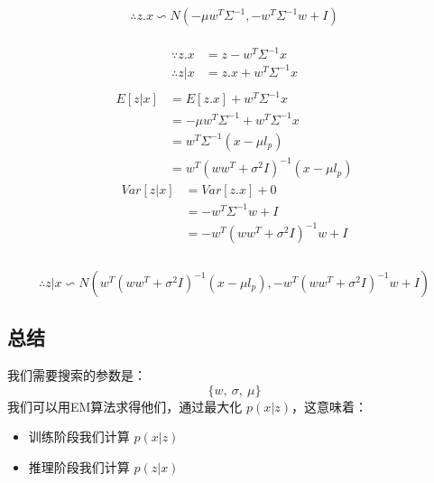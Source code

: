 \documentclass{report}
\begin{document}
\begin{equation}
\therefore z.x \backsim N(-\mu w^T \Sigma^{-1}, -w^T \Sigma^{-1} w + I)
\end{equation}\\
\begin{equation}
\begin{aligned}
\because 
z.x &= z - w^T \Sigma^{-1} x\\
\therefore 
z|x &= z.x + w^T \Sigma^{-1} x\\
\end{aligned}
\end{equation}
\begin{equation}
\begin{aligned}
E[z|x] 
&= E[z.x] + w^T \Sigma^{-1} x\\
&= -\mu w^T \Sigma^{-1} + w^T \Sigma^{-1} x\\
&= w^T \Sigma^{-1} (x - \mu l_p)\\
&= w^T (ww^T + \sigma^2 I)^{-1}(x - \mu l_p)
\end{aligned}
\end{equation}
\begin{equation}
\begin{aligned}
Var[z|x] 
&= Var[z.x] + 0\\
&= -w^T \Sigma^{-1} w + I\\
&= -w^T (ww^T + \sigma^2 I)^{-1} w + I\\
\end{aligned}
\end{equation}\\
\begin{equation}
\therefore
z|x \backsim N(w^T (ww^T + \sigma^2 I)^{-1}(x - \mu l_p), -w^T (ww^T + \sigma^2 I)^{-1} w + I)
\end{equation}
\subsection{总结}
我们需要搜索的参数是：
$$
\{ w, \ \sigma , \ \mu \}
$$
我们可以用EM算法求得他们，通过最大化 $p(x|z)$，这意味着：
\begin{itemize}
	\item 训练阶段我们计算 $p(x|z)$
	\item 推理阶段我们计算 $p(z|x)$
\end{itemize}
\end{document}
